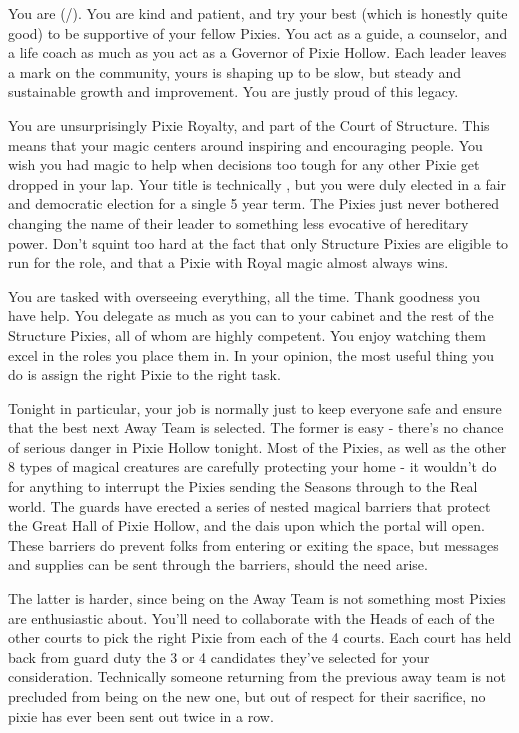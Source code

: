 \documentclass[char]{PP}
\begin{document}
\name{\cSHead{}}

You are \cSHead{} (\cSHead{\They}/\cSHead{\Them}). You are kind and patient, and try your best (which is honestly quite good) to be supportive of your fellow Pixies. You act as a guide, a counselor, and a life coach as much as you act as a Governor of Pixie Hollow. Each leader leaves a mark on the community, yours is shaping up to be slow, but steady and sustainable growth and improvement. You are justly proud of this legacy. 

You are unsurprisingly Pixie Royalty, and part of the Court of Structure. This means that your magic centers around inspiring and encouraging people. You wish you had magic to help when decisions too tough for any other Pixie get dropped in your lap. Your title is technically \cSHead{\Majesty}, but you were duly elected in a fair and democratic election for a single 5 year term. The Pixies just never bothered changing the name of their leader to something less evocative of hereditary power. Don't squint too hard at the fact that only Structure Pixies are eligible to run for the role, and that a Pixie with Royal magic almost always wins.

You are tasked with overseeing everything, all the time. Thank goodness you have help. You delegate as much as you can to your cabinet and the rest of the Structure Pixies, all of whom are highly competent. You enjoy watching them excel in the roles you place them in. In your opinion, the most useful thing you do is assign the right Pixie to the right task.

Tonight in particular, your job is normally just to keep everyone safe and ensure that the best next Away Team is selected. The former is easy - there's no chance of serious danger in Pixie Hollow tonight. Most of the Pixies, as well as the other 8 types of magical creatures are carefully protecting your home - it wouldn't do for anything to interrupt the Pixies sending the Seasons through to the Real world. The guards have erected a series of nested magical barriers that protect the Great Hall of Pixie Hollow, and the dais upon which the portal will open. These barriers do prevent folks from entering or exiting the space, but messages and supplies can be sent through the barriers, should the need arise.

The latter is harder, since being on the Away Team is not something most Pixies are enthusiastic about. You'll need to collaborate with the Heads of each of the other courts to pick the right Pixie from each of the 4 courts. Each court has held back from guard duty the 3 or 4 candidates they've selected for your consideration. Technically someone returning from the previous away team is not precluded from being on the new one, but out of respect for their sacrifice, no pixie has ever been sent out twice in a row.
\end{document}
